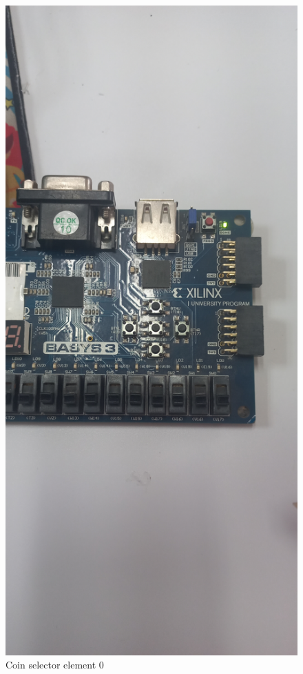 \documentclass{article}
\begin{document}
\begin{multicols}{2}
	\begin{figure}[H]
		\centering
		\includegraphics[width=1\linewidth]{images/diagrams/coin-selector/coin-selector0.jpg}
		\caption{Coin selector element 0}
		\label{Coin selector element 0 Apendix}
	\end{figure}


\end{multicols}
\end{document}

